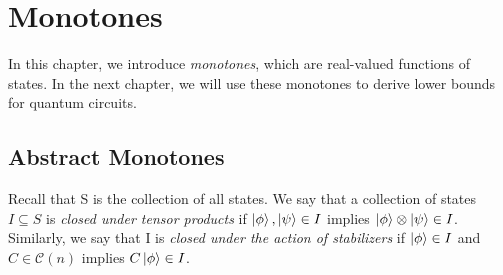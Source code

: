 \documentclass[12pt]{dalthesis}
\begin{document}
%




\chapter{Monotones}
In this chapter, we introduce \emph{monotones}, which are real-valued functions of states. In the next chapter, we will use these monotones to derive lower bounds for quantum circuits. 

\section{Abstract Monotones}
Recall that S is the collection of all states. We say that a collection of states $I \subseteq S$ is \emph{closed under tensor products} if $\ket{\phi}, \ket{\psi} \in I$ implies $\ket{\phi} \otimes \ket{\psi} \in I$. Similarly, we say that I is \emph{closed under the action of stabilizers} if $\ket{\phi} \in I$ and $C \in \mathcal{C}(n)$ implies $C\ket{\phi} \in I$.
\end{document}
